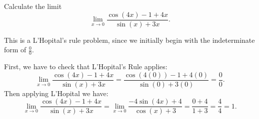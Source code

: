 \documentclass{ximera}
\author{Emma Smith Zbarsky}
\begin{document}
\begin{exercise}

Calculate the limit \[\lim_{x \to 0} \frac{\cos(4x)-1+4x}{\sin(x)+3x}.\]


\begin{hint}
This is a L'Hopital's rule problem, since we initially begin with the
indeterminate form of $\frac{0}{0}$.
\end{hint}


\begin{hint}
First, we have to check that L'Hopital's Rule applies:
\[\lim_{x\to 0} \frac{\cos(4x)-1+4x}{\sin(x)+3x} = \frac{\cos(4(0))-1+4(0)}{\sin(0)+3(0)} = \frac{0}{0}.\]
Then applying L'Hopital we have:
\[\lim_{x\to 0} \frac{\cos(4x)-1+4x}{\sin(x)+3x} = \lim_{x\to 0} \frac{-4\sin(4x)+4}{\cos(x)+3} = \frac{0+4}{1+3} = \frac{4}{4} = 1.\]
\end{hint}


\begin{multipleChoice}
\end{multipleChoice}

\end{exercise}
\end{document}
